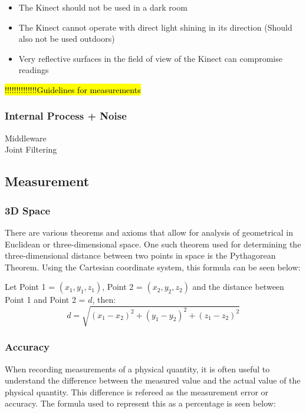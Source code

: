 \begin{itemize}
	\item The Kinect should not be used in a dark room
	\item The Kinect cannot operate with direct light shining in its direction (Should also not be used outdoors)
	\item Very reflective surfaces in the field of view of the Kinect can compromise readings	
\end{itemize} 

\hl{!!!!!!!!!!!!!!Guidelines for measurements} 

\subsubsection{Internal Process + Noise}
Middleware \cite{nonContact2017}\\
Joint Filtering\\

\subsection{Measurement}

\subsubsection{3D Space}
There are various theorems and axioms that allow for analysis of geometrical in Euclidean or three-dimensional space. One such theorem used for determining the three-dimensional distance between two points in space is the Pythagorean Theorem. Using the Cartesian coordinate system, this formula can be seen below: \cite{nonContact2017}

Let Point 1 = $(x_1, y_1, z_1)$, Point 2 = $(x_2, y_2, z_2)$ and the distance between Point 1 and Point 2 = $d$, then:\\
\begin{equation} \label{eq: distance}
d = \sqrt{(x_1 - x_2)^{2} + (y_1 - y_2)^{2} + (z_1 - z_2)^{2}}
\end{equation} 

\subsubsection{Accuracy}
When recording measurements of a physical quantity, it is often useful to understand the difference between the measured value and the actual value of the physical quantity. This difference is refereed as the measurement error or accuracy. The formula used to represent this as a percentage is seen below: \cite{nonContact2017}

